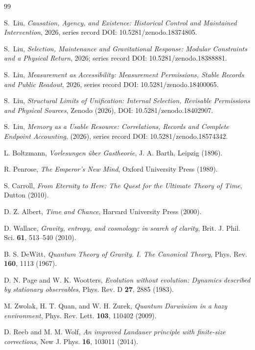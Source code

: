 \documentclass[12pt,a4paper]{article}
\begin{document}
\begin{thebibliography}{99}

S.~Liu, \emph{Causation, Agency, and Existence: Historical Control and Maintained Intervention}, 2026, series record DOI: 10.5281/zenodo.18374805.

S.~Liu, \emph{Selection, Maintenance and Gravitational Response: Modular Constraints and a Physical Return}, 2026; series record DOI: 10.5281/zenodo.18388881.

S.~Liu, \emph{Measurement as Accessibility: Measurement Permissions, Stable Records and Public Readout}, 2026, series record DOI: 10.5281/zenodo.18400065.

S.~Liu, \emph{Structural Limits of Unification: Internal Selection, Revisable Permissions and Physical Sources}, Zenodo (2026), DOI: 10.5281/zenodo.18402907.

S.~Liu, \emph{Memory as a Usable Resource: Correlations, Records and Complete Endpoint Accounting}, (2026), series record DOI: 10.5281/zenodo.18574342.

L. Boltzmann, \emph{Vorlesungen \"uber Gastheorie}, J. A. Barth, Leipzig (1896).

R. Penrose, \emph{The Emperor's New Mind}, Oxford University Press (1989).

S. Carroll, \emph{From Eternity to Here: The Quest for the Ultimate Theory of Time}, Dutton (2010).

D. Z. Albert, \emph{Time and Chance}, Harvard University Press (2000).

D. Wallace, \emph{Gravity, entropy, and cosmology: in search of clarity}, Brit. J. Phil. Sci. \textbf{61}, 513--540 (2010).

B. S. DeWitt, \emph{Quantum Theory of Gravity. I. The Canonical Theory}, Phys. Rev. \textbf{160}, 1113 (1967).

D. N. Page and W. K. Wootters, \emph{Evolution without evolution: Dynamics described by stationary observables}, Phys. Rev. D \textbf{27}, 2885 (1983).

M. Zwolak, H. T. Quan, and W. H. Zurek, \emph{Quantum Darwinism in a hazy environment}, Phys. Rev. Lett. \textbf{103}, 110402 (2009).

D. Reeb and M. M. Wolf, \emph{An improved Landauer principle with finite-size corrections}, New J. Phys. \textbf{16}, 103011 (2014).


\end{thebibliography}
\end{document}
